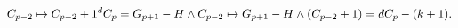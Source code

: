 \begin{equation}
C_{p-2}\mapsto C_{p-2}+1\sp
dC_p=G_{p+1}-H\wedge C_{p-2}\mapsto G_{p+1}-H\wedge (C_{p-2}+1)=dC_p-(k+1).
\end{equation}

